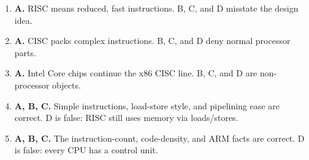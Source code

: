 \documentclass[11pt]{article}
\begin{document}
\begin{enumerate}[label=\textbf{Q\arabic*.}, leftmargin=*]
\item \textbf{A.} RISC means reduced, fast instructions. B, C, and D misstate the design idea.
\item \textbf{A.} CISC packs complex instructions. B, C, and D deny normal processor parts.
\item \textbf{A.} Intel Core chips continue the x86 CISC line. B, C, and D are non-processor objects.
\item \textbf{A, B, C.} Simple instructions, load-store style, and pipelining ease are correct. D is false: RISC still uses memory via loads/stores.
\item \textbf{A, B, C.} The instruction-count, code-density, and ARM facts are correct. D is false: every CPU has a control unit.
\end{enumerate}
\def\JKSSBLessonID{59}\def\JKSSBAnswers{1}
\end{document}
